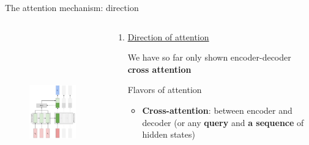 \documentclass[12pt,aspectratio=169,handout]{beamer}
\newcounter{saveenumi}
\newcommand{\conti}{\setcounter{enumi}{\value{saveenumi}}}
\begin{document}
\begin{frame}{The attention mechanism: direction}

	\begin{columns}[T] %
		\begin{column}{.4\textwidth}
			\begin{figure}[h]
				\includegraphics[height=7cm]{seq2seq_attn_encdec.pdf}
			\end{figure}
		\end{column}
		\begin{column}{.6\textwidth}
			\begin{enumerate}
				\conti
				\item \underline{Direction of attention}
		
				We have so far only shown encoder-decoder \textbf{cross attention}
				\pause
				\hspace{1em}
				
				Flavors of attention
				\begin{itemize}
					\item \textbf{Cross-attention}:
					between encoder and decoder (or any \textbf{query} and \textbf{a sequence} of hidden states)
				\end{itemize}
			\end{enumerate}
		\end{column}
	\end{columns}

\end{frame}
\end{document}
